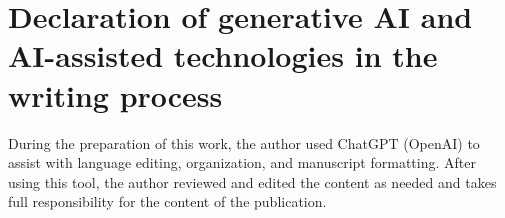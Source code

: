 \documentclass[11pt]{article}
\theoremstyle{plain}
\theoremstyle{definition}
\theoremstyle{remark}
\begin{document}
\section*{Declaration of generative AI and AI-assisted technologies in the writing process}
During the preparation of this work, the author used ChatGPT (OpenAI) to assist with language editing, organization, and manuscript formatting. After using this tool, the author reviewed and edited the content as needed and takes full responsibility for the content of the publication.

\printbibliography
\end{document}
